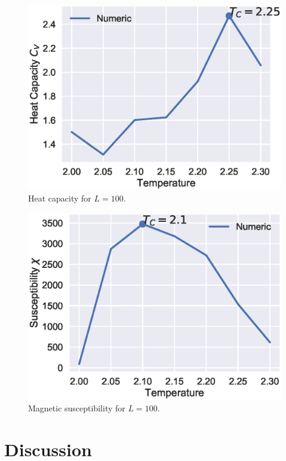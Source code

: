 \documentclass[aps,reprint]{revtex4-1}
\begin{document}
\begin{figure}[H]
  \centering
  \includegraphics[width=\columnwidth]{figures/L100Cv.eps}
  \caption{\label{fig:100CVTc} Heat capacity for \(L=100\).}
\end{figure}

\begin{figure}[H]
  \centering
  \includegraphics[width=\columnwidth]{figures/L100sus.eps}
  \caption{\label{fig:100CVTc} Magnetic susceptibility for \(L=100\).}
\end{figure}

\section{Discussion}
\label{sec:discussion}
\end{document}
